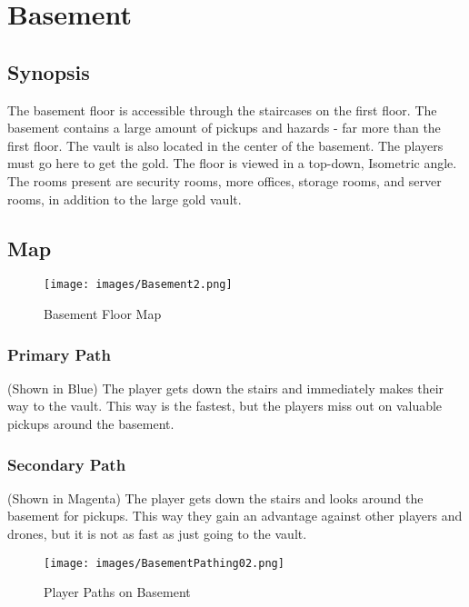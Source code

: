 \documentclass[10pt]{report}
\begin{document}
\section{Basement}

\subsection{Synopsis}

The basement floor is accessible through the staircases on the first floor. The basement contains a large amount of pickups and hazards - far more than the first floor. The vault is also located in the center of the basement. The players must go here to get the gold. The floor is viewed in a top-down, Isometric angle. The rooms present are security rooms, more offices, storage rooms, and server rooms, in addition to the large gold vault.

\subsection{Map}

\begin{figure}[H]
    \centering
    \texttt{[image: images/Basement2.png]}
    \caption{Basement Floor Map}
\end{figure}

\subsubsection{Primary Path}

(Shown in Blue) The player gets down the stairs and immediately makes their way to the vault. This way is the fastest, but the players miss out on valuable pickups around the basement.

\subsubsection{Secondary Path}

(Shown in Magenta) The player gets down the stairs and looks around the basement for pickups. This way they gain an advantage against other players and drones, but it is not as fast as just going to the vault.


\begin{figure}[H]
    \centering
    \texttt{[image: images/BasementPathing02.png]}
    \caption{Player Paths on Basement}
\end{figure}
\end{document}
